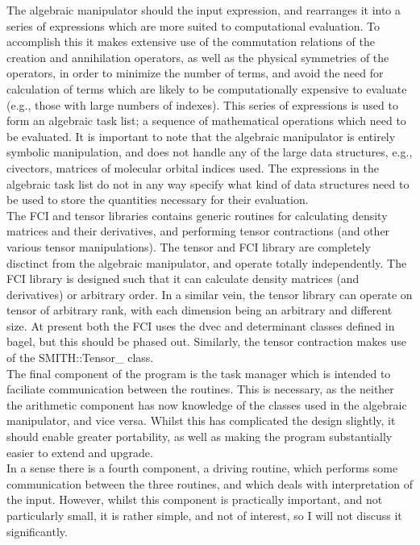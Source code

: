 \documentclass[12pt]{article}
\begin{document}
\noindent The algebraic manipulator should the input expression, and rearranges
it into a series of expressions which are more suited to computational
evaluation.  To accomplish this it makes extensive use of the commutation
relations of the creation and annihilation operators, as well as the physical
symmetries of the operators, in order to minimize the number of terms, and
avoid the need for calculation of terms which are likely to be computationally
expensive to evaluate (e.g., those with large numbers of indexes). This series
of expressions is used to form an algebraic task list; a sequence of
mathematical operations which need to be evaluated.  It is important to note
that the algebraic manipulator is entirely symbolic manipulation, and does not
handle any of the large data structures, e.g., civectors, matrices of molecular
orbital indices used. The expressions in the algebraic task list do not in any
way specify what kind of data structures need to be used to store the
quantities necessary for their evaluation.\\

\noindent The FCI and tensor libraries contains generic routines for
calculating density matrices and their derivatives, and performing tensor
contractions (and other various tensor manipulations). The tensor and FCI
library are completely disctinct from the algebraic manipulator, and operate
totally independently. The FCI library is designed such that it can calculate
density matrices (and derivatives) or arbitrary order. In a similar vein, the
tensor library can operate on tensor of arbitrary rank, with each dimension
being an arbitrary and different size. At present both the FCI uses the dvec
and determinant classes defined in bagel, but this should be phased out.
Similarly, the tensor contraction makes use of the SMITH::Tensor\_ class. \\

\noindent The final component of the program is the task manager which is
intended to faciliate communication between the routines. This is necessary, as
the neither the arithmetic component has now knowledge of the classes used in
the algebraic manipulator, and vice versa. Whilst this has complicated the
design slightly, it should enable greater portability, as well as making the
program substantially easier to extend and upgrade.\\ 

\noindent In a sense there is a fourth component, a driving routine, which
performs some communication between the three routines, and which deals with
interpretation of the input. However, whilst this component is practically
important, and not particularly small, it is rather simple, and not of
interest, so I will not discuss it significantly.
\end{document}
